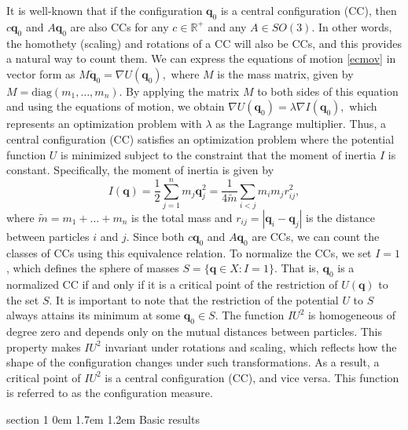 \documentclass[final,11pt]{article}
\makeatletter
\renewcommand{\section}{\@startsection%
{section}%
{1}%
{0em}%
{1.7em}%
{1.2em}%
{\normalfont\large\centering\bfseries}}
\numberwithin{equation}{section}
\theoremstyle{definition}
\makeatother
\begin{document}
It is well-known that if the configuration $ \mathbf{q}_0 $ is a central configuration (CC), then $ c \mathbf{q}_0 $ and $ A \mathbf{q}_0 $ are also CCs for any $ c \in \mathbb{R}^{+} $ and any $ A \in SO(3) $. In other words, the homothety (scaling) and rotations of a CC will also be CCs, and this provides a natural way to count them.  We can express the equations of motion \eqref{ecmov} in vector form as
$M \ddot{\mathbf{q}}_0 = \nabla U(\mathbf{q}_0),$
where $ M $ is the mass matrix, given by $ M = \text{diag}(m_1, \dots, m_n) $. By applying the matrix $ M $ to both sides of this equation and using the equations of motion, we obtain
$
\nabla U(\mathbf{q}_0) = \lambda \nabla I(\mathbf{q}_0),
$
which represents an optimization problem with $ \lambda $ as the Lagrange multiplier. Thus, a central configuration (CC) satisfies an optimization problem where the potential function $ U $ is minimized subject to the constraint that the moment of inertia $ I $ is constant. Specifically, the moment of inertia is given by
\begin{equation*}
I(\mathbf{q}) = \frac{1}{2} \sum_{j=1}^n m_j \mathbf{q}_j^2 = \frac{1}{4\tilde{m}} \sum_{i<j} m_i m_j r_{ij}^2,
\end{equation*}
where $ \tilde{m} = m_1 + \dots + m_n $ is the total mass and $ r_{ij} = |\mathbf{q}_i - \mathbf{q}_j| $ is the distance between particles $ i $ and $ j $.
Since both $ c \mathbf{q}_0 $ and $ A \mathbf{q}_0 $ are CCs, we can count the classes of CCs using this equivalence relation. To normalize the CCs, we set $ I = 1 $, which defines the sphere of masses $ S = \{ \mathbf{q} \in X : I = 1 \} $. That is, $ \mathbf{q}_0 $ is a normalized CC if and only if it is a critical point of the restriction of $ U(\mathbf{q}) $ to the set $ S $. It is important to note that the restriction of the potential $ U $ to $ S $ always attains its minimum at some $ \mathbf{q}_0 \in S $. The function $ I U^2 $ is homogeneous of degree zero and depends only on the mutual distances between particles. This property makes $ I U^2 $ invariant under rotations and scaling, which reflects how the shape of the configuration changes under such transformations. As a result, a critical point of $ I U^2 $ is a central configuration (CC), and vice versa. This function is referred to as the configuration measure.

\section{Basic results}\label{basicresults}
\end{document}

